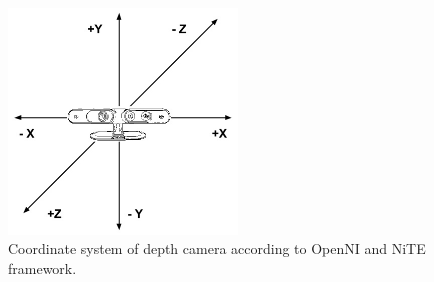 \begin{figure}
	[h] \centering 
	\includegraphics[height=6cm]{figures/content/xtion-origin.jpg} \caption{Coordinate system of depth camera according to OpenNI and NiTE framework. \cite{nite-spec} } \label{fg:xtion:origin} 
\end{figure}
